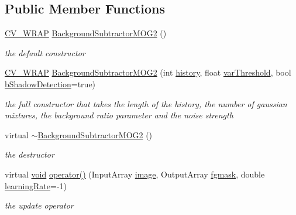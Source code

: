 \subsection*{Public Member Functions}
\begin{DoxyCompactItemize}
\item 
\hyperlink{core_2types__c_8h_ae435babf3ce7cca990524b23adf6b4a3}{C\-V\-\_\-\-W\-R\-A\-P} \hyperlink{classcv_1_1BackgroundSubtractorMOG2_a7b1ab507f04ad8fe3f3bb76312732231}{Background\-Subtractor\-M\-O\-G2} ()
\begin{DoxyCompactList}\small\item\em the default constructor \end{DoxyCompactList}\item 
\hyperlink{core_2types__c_8h_ae435babf3ce7cca990524b23adf6b4a3}{C\-V\-\_\-\-W\-R\-A\-P} \hyperlink{classcv_1_1BackgroundSubtractorMOG2_ae32743988e75f1cc7bc1ca744255dba6}{Background\-Subtractor\-M\-O\-G2} (int \hyperlink{classcv_1_1BackgroundSubtractorMOG2_a4f9ee3abc7718c771437c954ce787670}{history}, float \hyperlink{classcv_1_1BackgroundSubtractorMOG2_a29b2fd0136714c18f5dac426f23891e3}{var\-Threshold}, bool \hyperlink{classcv_1_1BackgroundSubtractorMOG2_ad3f5f023594da1e0e90e85c7c04a5bf2}{b\-Shadow\-Detection}=true)
\begin{DoxyCompactList}\small\item\em the full constructor that takes the length of the history, the number of gaussian mixtures, the background ratio parameter and the noise strength \end{DoxyCompactList}\item 
virtual \hyperlink{classcv_1_1BackgroundSubtractorMOG2_a90f856e25c64f088180cfaa841b8af05}{$\sim$\-Background\-Subtractor\-M\-O\-G2} ()
\begin{DoxyCompactList}\small\item\em the destructor \end{DoxyCompactList}\item 
virtual \hyperlink{legacy_8hpp_a8bb47f092d473522721002c86c13b94e}{void} \hyperlink{classcv_1_1BackgroundSubtractorMOG2_ad59120c6709073e6b13a9ae5a53ed7fb}{operator()} (Input\-Array \hyperlink{legacy_8hpp_ad62b16ab219ae2483e8a3d921c44cc97}{image}, Output\-Array \hyperlink{classcv_1_1BackgroundSubtractor_a3a04333e20f88e6799f368d7abb2abd9}{fgmask}, double \hyperlink{classcv_1_1BackgroundSubtractor_a98797ef02141e31b050f1ed6259fd229}{learning\-Rate}=-\/1)
\begin{DoxyCompactList}\small\item\em the update operator \end{DoxyCompactList}\item 

\end{DoxyCompactItemize}
